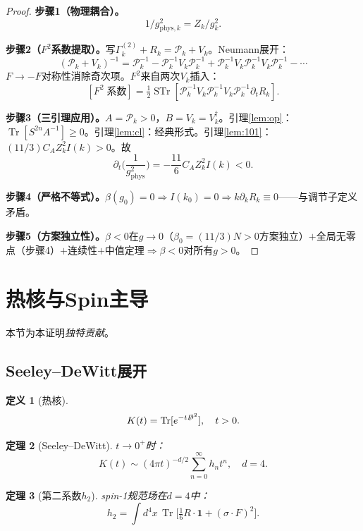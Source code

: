 \documentclass[12pt,a4paper]{article}
\theoremstyle{plain}
\newtheorem{theorem}{定理}[section]\newtheorem{lemma}[theorem]{引理}\newtheorem{corollary}[theorem]{推论}\newtheorem{proposition}[theorem]{命题}
\theoremstyle{definition}\newtheorem{definition}[theorem]{定义}
\theoremstyle{remark}\newtheorem{remark}[theorem]{注记}
\begin{document}
\begin{proof}
\textbf{步骤1（物理耦合）。}
\begin{equation}\label{eq:gphys}
1/g_{\mathrm{phys},k}^2 = Z_k/g_k^2.
\end{equation}

\textbf{步骤2（$F^2$系数提取）。}写$\Gamma_k^{(2)}+R_k=\mathcal{P}_k+V_k$。Neumann展开：
\begin{equation}\label{eq:Neumann}
(\mathcal{P}_k+V_k)^{-1} = \mathcal{P}_k^{-1}-\mathcal{P}_k^{-1}V_k\mathcal{P}_k^{-1}+\mathcal{P}_k^{-1}V_k\mathcal{P}_k^{-1}V_k\mathcal{P}_k^{-1}-\cdots
\end{equation}
$F\to -F$对称性消除奇次项。$F^2$来自两次$V_k$插入：
\begin{equation}\label{eq:F2trace}
[F^2\;\text{系数}] = \tfrac{1}{2}\operatorname{STr}[\mathcal{P}_k^{-1}V_k\mathcal{P}_k^{-1}V_k\mathcal{P}_k^{-1}\partial_tR_k].
\end{equation}

\textbf{步骤3（三引理应用）。}$A=\mathcal{P}_k>0$，$B=V_k=V_k^\dagger$。引理\ref{lem:op}：$\operatorname{Tr}[S^{2n}A^{-1}]\geq 0$。引理\ref{lem:cl}：经典形式。引理\ref{lem:101}：$(11/3)C_AZ_k^2I(k)>0$。故
\begin{equation}\label{eq:betaflow}
\partial_t\!\Big(\frac{1}{g_{\mathrm{phys}}^2}\Big) = -\frac{11}{6}C_AZ_k^2I(k) < 0.
\end{equation}

\textbf{步骤4（严格不等式）。}$\beta(g_0)=0\Rightarrow I(k_0)=0\Rightarrow k\partial_kR_k\equiv 0$——与调节子定义矛盾。

\textbf{步骤5（方案独立性）。}$\beta<0$在$g\to 0$（$\beta_0=(11/3)N>0$方案独立）$+$全局无零点（步骤4）$+$连续性$+$中值定理$\Rightarrow\beta<0$对所有$g>0$。
\end{proof}


\section{热核与Spin主导}\label{sec:heat}
本节为本证明\emph{独特贡献}。
\subsection{Seeley--DeWitt展开}\label{sec:SD}
\begin{definition}[热核]\label{def:heat}
\begin{equation}\label{eq:heat}
K(t)=\operatorname{Tr}[e^{-t\slashed{D}^2}],\quad t>0.
\end{equation}
\end{definition}
\begin{theorem}[Seeley--DeWitt\cite{Gilkey1995}]\label{thm:SD}
$t\to 0^+$时：
\begin{equation}\label{eq:SD}
K(t)\sim(4\pi t)^{-d/2}\sum_{n=0}^\infty h_n t^n,\quad d=4.
\end{equation}
\end{theorem}
\begin{theorem}[第二系数$h_2$]\label{thm:h2}
spin-1规范场在$d=4$中：
\begin{equation}\label{eq:h2}
h_2=\int d^4x\,\operatorname{Tr}\Big[\tfrac{1}{6}R\cdot\mathbf{1}+(\sigma\cdot F)^2\Big].
\end{equation}
\end{theorem}
\end{document}
